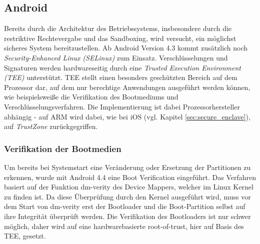 \subsection{Android}\label{sec:android-hwsec}

	Bereits durch die Architektur des Betriebssystems, insbesondere durch die
	restriktive Rechtevergabe und das Sandboxing, wird versucht, ein möglichst
	sicheres System bereitzustellen. Ab Android Version 4.3 kommt zusätzlich noch
	\textit{Security-Enhanced Linux (SELinux)} zum Einsatz. Verschlüsselungen und
	Signaturen werden hardwareseitig durch eine \textit{Trusted Execution
	Environment (TEE)} unterstützt. TEE stellt einen besonders geschützten Bereich
	auf dem Prozessor dar, auf dem nur berechtige Anwendungen ausgeführt werden
	können, wie beispielsweiße die Verifikation des Bootmediums und
	Verschlüsselungsverfahren. Die Implementierung ist dabei Prozessorhersteller
	abhängig - auf ARM wird dabei, wie bei iOS (vgl. Kapitel
	\ref{sec:secure_enclave}), auf \textit{TrustZone} \cite{TEE_ARM}
	zurückgegriffen.
	
	\subsubsection{Verifikation der Bootmedien}
	\label{sec:VerifikationDerBootmedien} Um bereits bei Systemstart eine
	Veränderung oder Ersetzung der Partitionen zu erkennen, wurde mit Android 4.4
	eine Boot Verification eingeführt. Das Verfahren basiert auf der Funktion
	dm-verity des Device Mappers, welcher im Linux Kernel zu finden ist. Da diese
	Überprüfung durch den Kernel ausgeführt wird, muss vor dem Start von dm-verity
	erst der Bootloader und die Boot-Partition selbst auf ihre Integrität
	überprüft werden. Die Verifikation des Bootloaders ist nur schwer möglich,
	daher wird auf eine hardwarebasierte root-of-trust, hier auf Basis
	des TEE, gesetzt.
	
